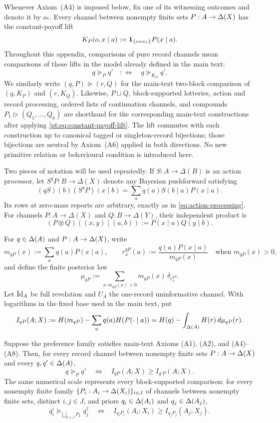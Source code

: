 Whenever Axiom~\textup{(A4)} is imposed below, fix one of its witnessing
outcomes and denote it by $o_\ast$.  Every channel between nonempty finite sets
$P:A\to\Delta(X)$ has the constant-payoff lift
\begin{equation}
K_P(o,x\mid a):=\mathbf 1_{\{o=o_\ast\}}P(x\mid a).
\label{pt:eq:constant-payoff-lift}
\end{equation}
Throughout this appendix, comparisons of pure record channels mean comparisons
of these lifts in the model already defined in the main text:
\[
q\succeq_Pq'\quad:\Longleftrightarrow\quad q\succeq_{K_P}q'.
\]
We similarly write $(q,P)\succeq(r,Q)$ for the main-text two-block
comparison of $(q,K_P)$ and $(r,K_Q)$.
Likewise, $P\sqcup Q$, block-supported lotteries, action and record
processing, ordered lists of continuation channels, and compounds
$P_1\triangleright(Q_1,\ldots,Q_k)$ are shorthand for the
corresponding main-text constructions after applying
\eqref{pt:eq:constant-payoff-lift}.  The lift commutes with each construction
up to canonical tagged or singleton-record bijections; those bijections are
neutral by Axiom~\textup{(A6)} applied in both directions.  No new primitive
relation or behavioural condition is introduced here.

Two pieces of notation will be used repeatedly.  If
$S:A\to\Delta(B)$ is an action processor, let $S^qP:B\to\Delta(X)$ denote any
Bayesian pushforward satisfying
\[
 (qS)(b)(S^qP)(x\mid b)
 =\sum_a q(a)S(b\mid a)P(x\mid a).
\]
Its rows at zero-mass reports are arbitrary, exactly as in
\eqref{eq:action-processing}.  For channels $P:A\to\Delta(X)$ and
$Q:B\to\Delta(Y)$, their independent product is
\[
 (P\otimes Q)((x,y)\mid(a,b)):=P(x\mid a)Q(y\mid b).
\]

For $q\in\Delta(A)$ and $P:A\to\Delta(X)$, write
\[
m_{qP}(x):=\sum_a q(a)P(x\mid a),
\qquad
r_x^{qP}(a):=\frac{q(a)P(x\mid a)}{m_{qP}(x)}
\quad\text{when }m_{qP}(x)>0,
\]
and define the finite posterior law
\[
\mu_{qP}:=
\sum_{x:m_{qP}(x)>0}m_{qP}(x)\,\delta_{r_x^{qP}}.
\]
Let $\operatorname{Id}_A$ be full revelation and $U_A$ the one-record uninformative
channel.  With logarithms in the fixed base used in the main text, put
\[
I_{qP}(A;X)
:=H(m_{qP})-\sum_a q(a)H(P(\cdot\mid a))
=H(q)-\int_{\Delta(A)}H(r)\,d\mu_{qP}(r).
\]

\begin{proposition}\label{pt:prop:main}
Suppose the preference family satisfies main-text Axioms
\textup{(A1)}, \textup{(A2)}, and \textup{(A4)--(A8)}.  Then, for every record channel between
nonempty finite sets
$P:A\to\Delta(X)$ and every $q,q'\in\Delta(A)$,
\[
q\succeq_Pq'
\quad\Longleftrightarrow\quad
I_{qP}(A;X)\ge I_{q'P}(A;X).
\]
The same numerical scale represents every block-supported comparison: for
every nonempty finite family $\{P_i:A_i\to\Delta(X_i)\}_{i\in J}$ of channels
between nonempty finite sets, distinct $i,j\in J$,
and priors $q_i\in\Delta(A_i)$ and $q_j\in\Delta(A_j)$,
\[
q_i^i\succeq_{\bigsqcup_{k\in J}P_k}q_j^j
\quad\Longleftrightarrow\quad
I_{q_iP_i}(A_i;X_i)\ge I_{q_jP_j}(A_j;X_j).
\]
\end{proposition}

